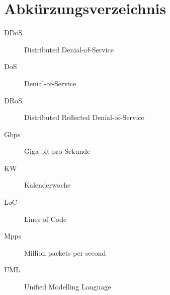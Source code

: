 \documentclass[../review_3.tex]{subfiles}
\begin{document}
\chapter{Abkürzungsverzeichnis}\thispagestyle{fancy}
\begin{description}
    \item[DDoS] Distributed Denial-of-Service
    \item[DoS] Denial-of-Service
    \item[DRoS] Distributed Reflected Denial-of-Service
    \item[Gbps] Giga bit pro Sekunde
    \item[KW] Kalenderwoche
    \item[LoC] Lines of Code
    \item[Mpps] Million packets per second
    \item[UML] Unified Modelling Language
\end{description}
\end{document}
